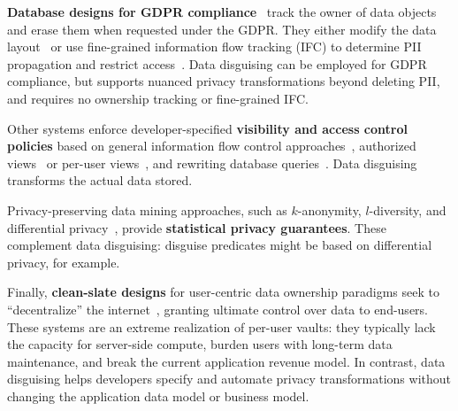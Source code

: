 \textbf{Database designs for GDPR compliance}~\cite{schengendb, usershards} track the owner of
data objects and erase them when requested under the GDPR.
%
They either modify the data layout~\cite{usershards} or use fine-grained information flow
tracking (IFC) to determine PII propagation and restrict access~\cite{schengendb}.
%
Data disguising can be employed for GDPR compliance, but supports nuanced privacy
transformations beyond deleting PII, and requires no ownership tracking or fine-grained IFC.
%

%
Other systems enforce developer-specified \textbf{visibility and access control policies}
based on general information flow control approaches~\cite{static, jeeves, jif, hails, ifdb},
%
authorized views~\cite{oracle} or per-user views~\cite{multiverse}, and rewriting database queries~\cite{qapla, sieve}.
%
Data disguising transforms the actual data stored.
%



Privacy-preserving data mining approaches, such as $k$-anonymity, $l$-diversity, and
differential privacy~\cite{dataminingmodels, differential}, provide \textbf{statistical privacy
guarantees}.
%
These complement data disguising: disguise predicates might be based on
differential privacy, for example.
%


Finally, \textbf{clean-slate designs} for user-centric data ownership paradigms seek to
``decentralize'' the internet~\cite{diy, solid, amber, oort, w5, blockstack, bstore, databox},
granting ultimate control over data to end-users.
%
These systems are an extreme realization of per-user vaults: they typically lack the
capacity for server-side compute, burden users with long-term data maintenance, and break
the current application revenue model.
%
In contrast, data disguising helps developers specify and automate privacy transformations
without changing the application data model or business model.
%

